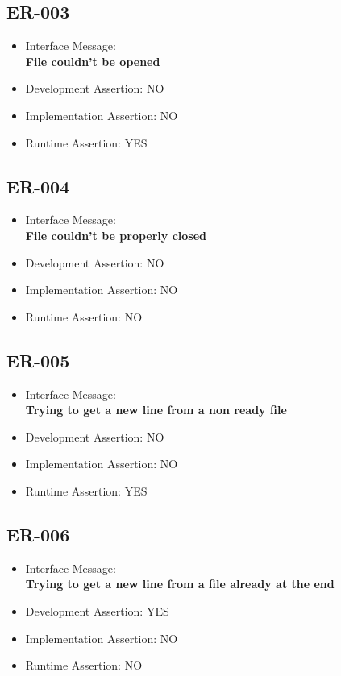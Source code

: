 \subsection{ER-003}
\begin{itemize}
  \item Interface Message:\\[1em]\textbf{File couldn't be opened}
  \item Development Assertion: NO
  \item Implementation Assertion: NO
  \item Runtime Assertion: YES
\end{itemize}

\subsection{ER-004}
\begin{itemize}
  \item Interface Message:\\[1em]\textbf{File couldn't be properly closed}
  \item Development Assertion: NO
  \item Implementation Assertion: NO
  \item Runtime Assertion: NO
\end{itemize}

\subsection{ER-005}
\begin{itemize}
  \item Interface Message:\\[1em]\textbf{Trying to get a new line from a non ready file}
  \item Development Assertion: NO
  \item Implementation Assertion: NO
  \item Runtime Assertion: YES
\end{itemize}

\subsection{ER-006}
\begin{itemize}
  \item Interface Message:\\[1em]\textbf{Trying to get a new line from a file already at the end}
  \item Development Assertion: YES
  \item Implementation Assertion: NO
  \item Runtime Assertion: NO
\end{itemize}

